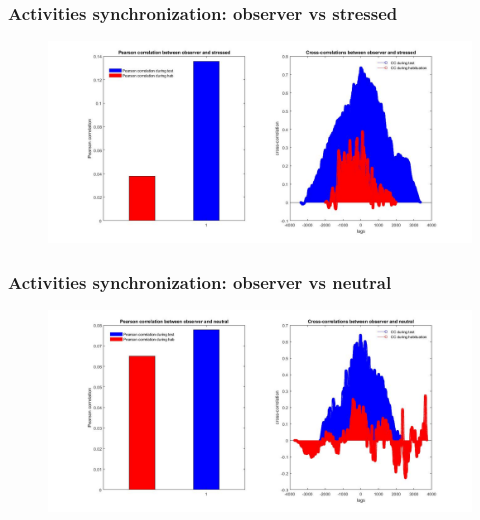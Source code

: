 \documentclass{beamer}
\begin{document}
\begin{frame}
\frametitle{Activities synchronization: observer vs stressed}





\begin{figure}[H]
	\begin{center}
		\hspace*{-1cm}
		\includegraphics[scale=.30]{obs_stress_sync.jpg} 
	\end{center}  
	
	
\end{figure}


\end{frame}	

\begin{frame}
\frametitle{Activities synchronization: observer vs neutral}





\begin{figure}[H]
	\begin{center}
		\hspace*{-1cm}
		\includegraphics[scale=.30]{obs_neutral_sync.jpg} 
	\end{center}  
	
	
\end{figure}


\end{frame}	
\end{document}
